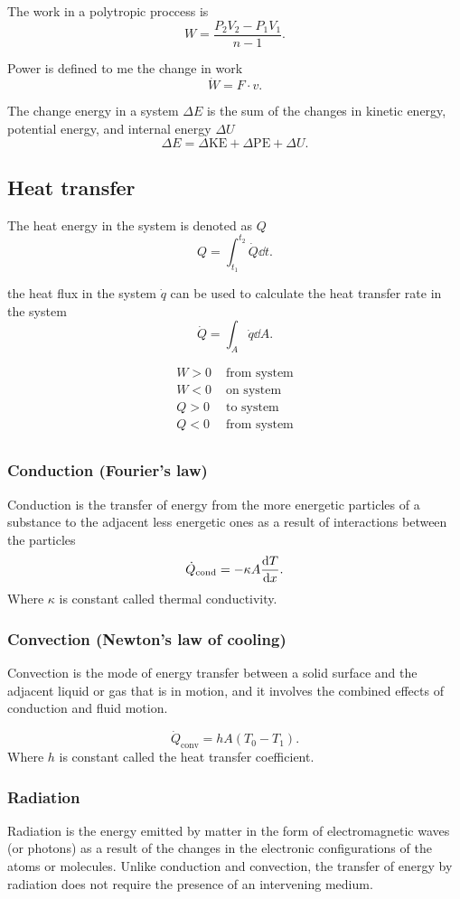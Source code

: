\documentclass{report}
\begin{document}
The work in a polytropic proccess is
\[
	W = \frac{P_2V_2-P_1V_1}{n-1}
	.\]

Power is defined to me the change in work
\[
	\dot{W} = F\cdot v
	.\]

The change energy in a system $\Delta E$ is the sum of the changes in kinetic energy, potential energy, and internal energy $\Delta U$
\[
	\Delta E = \Delta\text{KE} + \Delta\text{PE} + \Delta U
	.\]

\subsection{Heat transfer}

The heat energy in the system is denoted as $Q$
\[
	Q = \int_{t_1}^{t_2}\dot{Q}\dd{t}
	.\]

the heat flux in the system $\dot{q}$ can be used to calculate the heat transfer rate in the system
\[
	\dot{Q} = \int_A \dot{q}\dd{A}
	.\]

\begin{align*}
	W>0 & \text{ from system} \\
	W<0 & \text{ on system}   \\
	Q>0 & \text{ to system}   \\
	Q<0 & \text{ from system} \\
\end{align*}

\subsubsection{Conduction (Fourier’s law)}

Conduction is the transfer of energy from the more energetic particles of a substance to the adjacent less energetic ones as a result of interactions between the particles
\[
	\dot{Q}_\text{cond} =-\kappa A \dv{T}{x}
	.\]
Where $\kappa$ is constant called thermal conductivity.

\subsubsection{Convection (Newton’s law of cooling)}
Convection is the mode of energy transfer between a solid surface and the adjacent liquid or gas that is in motion, and it involves the combined effects of conduction and fluid motion.

\[
	\dot{Q}_\text{conv} = hA(T_0-T_1)
	.\]
Where $h$ is constant called the heat transfer coefficient.

\subsubsection{Radiation}
Radiation is the energy emitted by matter in the form of electromagnetic waves (or photons) as a result of the changes in the electronic configurations of the atoms or molecules. Unlike conduction and convection, the transfer of energy by radiation does not require the presence of an intervening medium.
\end{document}
